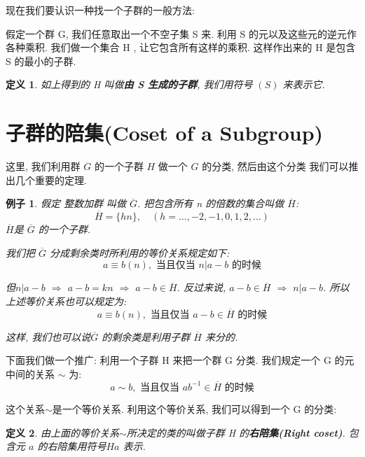 \documentclass[utf8]{ctexbook}
\newtheorem{definition}{定义}[section]
\newtheorem{example}{例子}[section]
\begin{document}
现在我们要认识一种找一个子群的一般方法:

假定一个群 G, 我们任意取出一个不空子集 S 来. 利用 S 的元以及这些元的逆元作各种乘积. 我们做一个集合 H , 让它包含所有这样的乘积. 这样作出来的 H 是包含 S 的最小的子群.
\begin{definition}
如上得到的 H 叫做\textbf{由 S 生成的子群}, 我们用符号 $(S)$ 来表示它.
\end{definition}

\section{子群的陪集(Coset of a Subgroup)}

这里, 我们利用群 $G$ 的一个子群 $H$ 做一个 $G$ 的分类, 然后由这个分类 我们可以推出几个重要的定理.

\begin{example}\label{example_integer_additive_group}
假定 整数加群 叫做 $\overline{G}$. 把包含所有 n 的倍数的集合叫做 $\overline{H}$:
\begin{equation}
\overline{H} = \{ hn \}, \quad (h=\ldots, -2, -1, 0, 1, 2, \ldots)
\end{equation}
$\overline{H}$是 $\overline{G}$ 的一个子群.

我们把 $\overline{G}$ 分成剩余类时所利用的等价关系规定如下:
\begin{equation}
a \equiv b (n), \mbox{ 当且仅当 } n | a-b \mbox{  的时候}
\end{equation}

但$n|a-b$ $\Longrightarrow$ $a-b=kn$ $\Longrightarrow$ $a-b \in \overline{H}$. 反过来说, $a-b \in \overline{H}$ $\Longrightarrow$ $n|a-b$. 所以上述等价关系也可以规定为:
\begin{equation}
a \equiv b (n), \mbox{ 当且仅当 } a-b \in \overline{H} \mbox{  的时候}
\end{equation}

这样, 我们也可以说$\overline{G}$ 的剩余类是利用子群 $\overline{H}$ 来分的.
\end{example}


下面我们做一个推广: 利用一个子群 H 来把一个群 G 分类. 我们规定一个 G 的元中间的关系 $\sim$ 为:
\begin{equation}
a \sim b, \mbox{ 当且仅当 } a b^{-1} \in \overline{H} \mbox{  的时候}
\end{equation}

这个关系$\sim$是一个等价关系. 利用这个等价关系, 我们可以得到一个 G 的分类:

\begin{definition}
由上面的等价关系$\sim$所决定的类的叫做子群 H 的\textbf{右陪集(Right coset)}.  包含元 $a$ 的右陪集用符号$Ha$ 表示. 
\end{definition}
\end{document}
